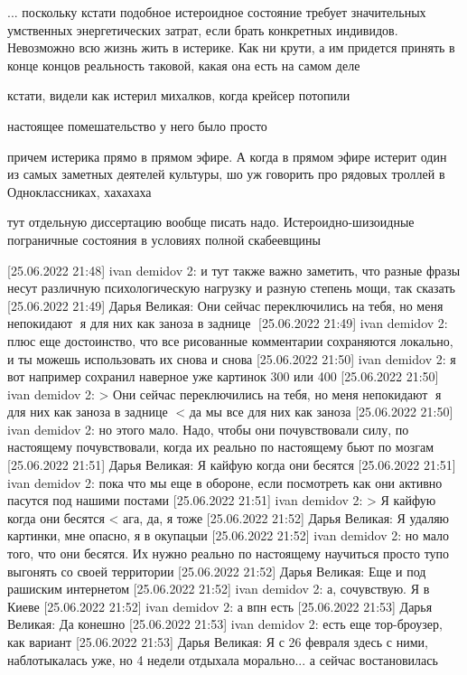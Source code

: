 ... поскольку кстати подобное истероидное состояние требует значительных
умственных энергетических затрат, если брать конкретных индивидов. Невозможно
всю жизнь жить в истерике. Как ни крути, а им придется принять в конце концов
реальность таковой, какая она есть на самом деле

кстати, видели как истерил михалков, когда крейсер потопили

настоящее помешательство у него было просто

причем истерика прямо в прямом эфире. А когда в прямом эфире истерит один из
самых заметных деятелей культуры, шо уж говорить про рядовых троллей в
Одноклассниках, хахахаха

тут отдельную диссертацию вообще писать надо. Истероидно-шизоидные пограничные
состояния в условиях полной скабеевщины

[25.06.2022 21:48] ivan demidov 2: и тут также важно заметить, что разные фразы несут различную психологическую нагрузку и разную степень мощи, так сказать
[25.06.2022 21:49] Дарья Великая: Они сейчас переключились на тебя, но меня непокидают🤣 я для них как заноза в заднице🤣
[25.06.2022 21:49] ivan demidov 2: плюс еще достоинство, что все рисованные комментарии сохраняются локально, и ты можешь использовать их снова и снова
[25.06.2022 21:50] ivan demidov 2: я вот например сохранил наверное уже картинок 300 или 400
[25.06.2022 21:50] ivan demidov 2: 
> Они сейчас переключились на тебя, но меня непокидают🤣 я для них как заноза в заднице🤣 <
да мы все для них как заноза
[25.06.2022 21:50] ivan demidov 2: но этого мало. Надо, чтобы они почувствовали силу, по настоящему почувствовали, когда их реально по настоящему бьют по мозгам
[25.06.2022 21:51] Дарья Великая: Я кайфую когда они бесятся
[25.06.2022 21:51] ivan demidov 2: пока что мы еще в обороне, если посмотреть как они активно пасутся под нашими постами
[25.06.2022 21:51] ivan demidov 2: 
> Я кайфую когда они бесятся <
ага, да, я тоже
[25.06.2022 21:52] Дарья Великая: Я удаляю картинки, мне опасно, я в окупацыи
[25.06.2022 21:52] ivan demidov 2: но мало того, что они бесятся. Их нужно реально по настоящему научиться просто тупо выгонять со своей территории
[25.06.2022 21:52] Дарья Великая: Еще и под рашиским интернетом
[25.06.2022 21:52] ivan demidov 2: а, сочувствую. Я в Киеве
[25.06.2022 21:52] ivan demidov 2: а впн есть
[25.06.2022 21:53] Дарья Великая: Да конешно
[25.06.2022 21:53] ivan demidov 2: есть еще тор-броузер, как вариант
[25.06.2022 21:53] Дарья Великая: Я с 26 февраля здесь с ними, наблотыкалась уже, но 4 недели отдыхала морально... а сейчас востановилась



